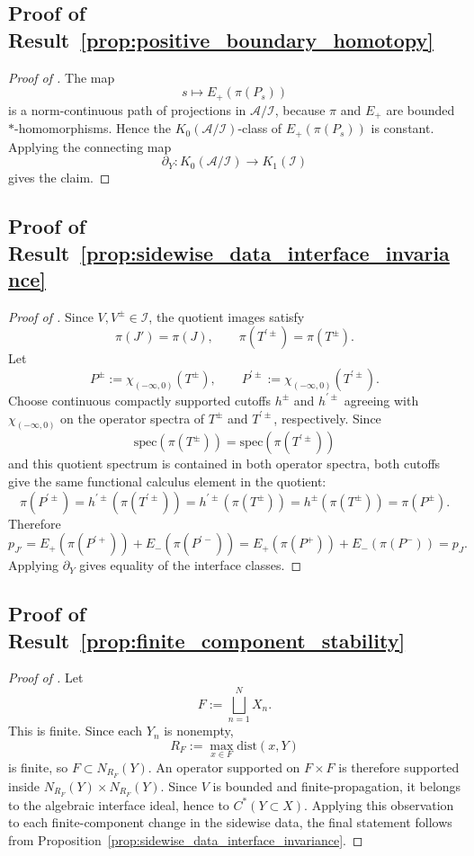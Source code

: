 \documentclass[11pt]{article}
\numberwithin{equation}{section}
\theoremstyle{definition}
\theoremstyle{remark}
\newcommand{\spec}{\mathrm{spec}}
\newcommand{\dist}{\mathrm{dist}}
\begin{document}
\subsection{Proof of Result~\ref{prop:positive_boundary_homotopy}}\label{app:proof:prop:positive_boundary_homotopy}
\begin{proof}[Proof of ]
The map
\[
s\longmapsto E_+(\pi(P_s))
\]
is a norm-continuous path of projections in $\mathcal A/\mathcal I$, because $\pi$ and $E_+$ are
bounded $*$-homomorphisms. Hence the $K_0(\mathcal A/\mathcal I)$-class of
$E_+(\pi(P_s))$ is constant. Applying the connecting map
\[
\partial_Y:K_0(\mathcal A/\mathcal I)\longrightarrow K_1(\mathcal I)
\]
gives the claim.
\end{proof}

\subsection{Proof of Result~\ref{prop:sidewise_data_interface_invariance}}\label{app:proof:prop:interface_supported_invariance}\label{app:proof:prop:sidewise_data_interface_invariance}
\begin{proof}[Proof of ]
Since $V,V^\pm\in\mathcal I$, the quotient images satisfy
\[
\pi(J')=\pi(J),
\qquad
\pi(T^{\prime\pm})=\pi(T^\pm).
\]
Let
\[
P^\pm:=\chi_{(-\infty,0)}(T^\pm),
\qquad
P^{\prime\pm}:=\chi_{(-\infty,0)}(T^{\prime\pm}).
\]
Choose continuous compactly supported cutoffs $h^\pm$ and $h^{\prime\pm}$ agreeing with
$\chi_{(-\infty,0)}$ on the operator spectra of $T^\pm$ and $T^{\prime\pm}$, respectively. Since
\[
\spec(\pi(T^\pm))=\spec(\pi(T^{\prime\pm}))
\]
and this quotient spectrum is contained in both operator spectra, both cutoffs give the same
functional calculus element in the quotient:
\[
\pi(P^{\prime\pm})
=
h^{\prime\pm}(\pi(T^{\prime\pm}))
=
h^{\prime\pm}(\pi(T^\pm))
=
h^\pm(\pi(T^\pm))
=
\pi(P^\pm).
\]
Therefore
\[
p_{J'}
=
E_+(\pi(P^{\prime +}))+E_-(\pi(P^{\prime -}))
=
E_+(\pi(P^+))+E_-(\pi(P^-))
=p_J.
\]
Applying $\partial_Y$ gives equality of the interface classes.
\end{proof}

\subsection{Proof of Result~\ref{prop:finite_component_stability}}\label{app:proof:prop:finite_component_stability}
\begin{proof}[Proof of ]
Let
\[
F:=\bigsqcup_{n=1}^N X_n.
\]
This is finite. Since each $Y_n$ is nonempty,
\[
R_F:=\max_{x\in F}\dist(x,Y)
\]
is finite, so $F\subset N_{R_F}(Y)$. An operator supported on $F\times F$ is therefore supported
inside \(N_{R_F}(Y)\times N_{R_F}(Y)\). Since $V$ is bounded and finite-propagation, it
belongs to the algebraic interface ideal, hence to $C^*(Y\subset X)$. Applying this observation to
each finite-component change in the sidewise data, the final statement follows from
Proposition~\ref{prop:sidewise_data_interface_invariance}.
\end{proof}
\end{document}
